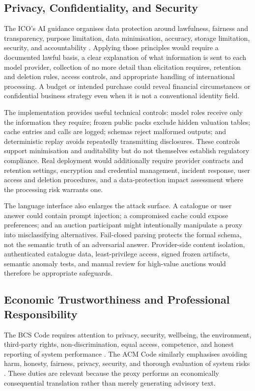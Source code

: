 \subsection{Privacy, Confidentiality, and Security}

The ICO's AI guidance organises data protection around lawfulness, fairness
and transparency, purpose limitation, data minimisation, accuracy, storage
limitation, security, and accountability \citep{icoAI}. Applying those
principles would require a documented lawful basis, a clear explanation of
what information is sent to each model provider, collection of no more detail
than elicitation requires, retention and deletion rules, access controls, and
appropriate handling of international processing. A budget or intended
purchase could reveal financial circumstances or confidential business
strategy even when it is not a conventional identity field.

The implementation provides useful technical controls: model roles receive
only the information they require; frozen public packs exclude hidden
valuation tables; cache entries and calls are logged; schemas reject malformed
outputs; and deterministic replay avoids repeatedly transmitting disclosures.
These controls support minimisation and auditability but do not themselves
establish regulatory compliance. Real deployment would additionally require
provider contracts and retention settings, encryption and credential
management, incident response, user access and deletion procedures, and a
data-protection impact assessment where the processing risk warrants one.

The language interface also enlarges the attack surface. A catalogue or user
answer could contain prompt injection; a compromised cache could expose
preferences; and an auction participant might intentionally manipulate a
proxy into misclassifying alternatives. Fail-closed parsing protects the
formal schema, not the semantic truth of an adversarial answer. Provider-side
content isolation, authenticated catalogue data, least-privilege access,
signed frozen artifacts, semantic anomaly tests, and manual review for
high-value auctions would therefore be appropriate safeguards.

\subsection{Economic Trustworthiness and Professional Responsibility}

The BCS Code requires attention to privacy, security, wellbeing, the
environment, third-party rights, non-discrimination, equal access, competence,
and honest reporting of system performance \citep{bcsCode}. The ACM Code
similarly emphasises avoiding harm, honesty, fairness, privacy, security, and
thorough evaluation of system risks \citep{acmCode}. These duties are relevant
because the proxy performs an economically consequential translation rather
than merely generating advisory text.

